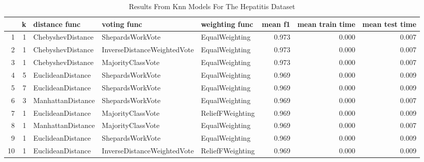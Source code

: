 \begin{table}
\centering
\caption{Results From Knn Models For The Hepatitis Dataset}
\label{tab:knn_results_hepatitis}
\begin{tabular}{rrlllrrr}
\toprule
 & k & distance func & voting func & weighting func & mean f1 & mean train time & mean test time \\
\midrule
1 & 1 & ChebyshevDistance & ShepardsWorkVote & EqualWeighting & 0.973 & 0.000 & 0.007 \\
2 & 1 & ChebyshevDistance & InverseDistanceWeightedVote & EqualWeighting & 0.973 & 0.000 & 0.007 \\
3 & 1 & ChebyshevDistance & MajorityClassVote & EqualWeighting & 0.973 & 0.000 & 0.007 \\
4 & 5 & EuclideanDistance & ShepardsWorkVote & EqualWeighting & 0.969 & 0.000 & 0.009 \\
5 & 7 & EuclideanDistance & ShepardsWorkVote & EqualWeighting & 0.969 & 0.000 & 0.009 \\
6 & 3 & ManhattanDistance & ShepardsWorkVote & EqualWeighting & 0.969 & 0.000 & 0.007 \\
7 & 1 & EuclideanDistance & MajorityClassVote & ReliefFWeighting & 0.969 & 0.000 & 0.009 \\
8 & 1 & ManhattanDistance & MajorityClassVote & EqualWeighting & 0.969 & 0.000 & 0.007 \\
9 & 1 & EuclideanDistance & ShepardsWorkVote & EqualWeighting & 0.969 & 0.000 & 0.009 \\
10 & 1 & EuclideanDistance & InverseDistanceWeightedVote & ReliefFWeighting & 0.969 & 0.000 & 0.009 \\
\bottomrule
\end{tabular}
\end{table}
